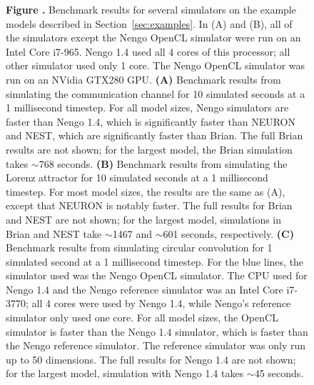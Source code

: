 \documentclass{frontiersSCNS}
\begin{document}
\begin{figure}
 \textbf{
   \label{fig:benchmarks}
   Figure .}{
   Benchmark results for several simulators
   on the example models described
   in Section~\ref{sec:examples}.
   In (A) and (B), all of the simulators
   except the Nengo OpenCL simulator
   were run on an Intel Core i7-965.
   Nengo 1.4 used all 4 cores of this processor;
   all other simulator used only 1 core.
   The Nengo OpenCL simulator
   was run on an NVidia GTX280 GPU.
   \textbf{(A)} Benchmark results from simulating
   the communication channel for 10 simulated seconds
   at a 1 millisecond timestep.
   For all model sizes, Nengo simulators
   are faster than Nengo 1.4,
   which is significantly faster than NEURON and NEST,
   which are significantly faster than Brian.
   The full Brian results are not shown;
   for the largest model,
   the Brian simulation takes $\sim$768 seconds.
   \textbf{(B)} Benchmark results from simulating
   the Lorenz attractor for 10 simulated seconds
   at a 1 millisecond timestep.
   For most model sizes,
   the results are the same as (A),
   except that NEURON is notably faster.
   The full results for Brian and NEST are not shown;
   for the largest model, simulations in Brian and NEST
   take $\sim$1467 and $\sim$601 seconds, respectively.
   \textbf{(C)} Benchmark results from simulating
   circular convolution for 1 simulated second
   at a 1 millisecond timestep.
   For the blue lines, the simulator used
   was the Nengo OpenCL simulator.
   The CPU used for Nengo 1.4 and
   the Nengo reference simulator
   was an Intel Core i7-3770;
   all 4 cores were used by Nengo 1.4,
   while Nengo's reference simulator
   only used one core.
   For all model sizes,
   the OpenCL simulator is faster
   than the Nengo 1.4 simulator,
   which is faster than the Nengo
   reference simulator.
   The reference simulator was only run
   up to 50 dimensions.
   The full results for Nengo 1.4
   are not shown; for the largest model,
   simulation with Nengo 1.4
   takes $\sim$45 seconds.}
\end{figure}
\end{document}

